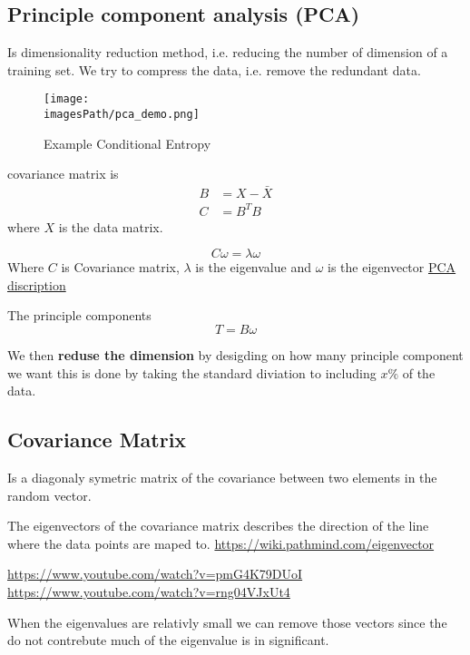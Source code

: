 \begin{multicols}{2}
\section{Principle component analysis (PCA)}
Is dimensionality reduction method, i.e. reducing the number of dimension of a training set.
We try to compress the data, i.e. remove the redundant data.
\begin{figure}[H]
    \centering
    \texttt{[image: \\imagesPath/pca\_demo.png]}
    \caption{Example Conditional Entropy}
    \label{fig:pca_demo}
\end{figure}

covariance matrix is 
\begin{align*}
   B &= X - \bar{X}  \\
   C &= B^TB
\end{align*}
where $X$ is the data matrix.

\begin{equation*}
    C\omega = \lambda\omega
\end{equation*}
Where $C$ is Covariance matrix, $\lambda$ is the eigenvalue and $\omega$ is the eigenvector
\href{https://www.youtube.com/watch?v=fkf4IBRSeEc}{PCA discription}

The principle components 
\begin{equation*}
    T = B\omega
\end{equation*}

We then \textbf{reduse the dimension} by desigding on how many principle component we want
this is done by taking the standard diviation to including $x\%$ of the data.


\subsection{Covariance Matrix}
Is a diagonaly symetric matrix of the covariance between two elements in the random vector.

The eigenvectors of the covariance matrix describes the direction of the line where the
data points are maped to.
\url{https://wiki.pathmind.com/eigenvector}


\url{https://www.youtube.com/watch?v=pmG4K79DUoI}
\url{https://www.youtube.com/watch?v=rng04VJxUt4}

When the eigenvalues are relativly small we can remove those vectors since the do 
not contrebute much of the eigenvalue is in significant.



\end{multicols}
